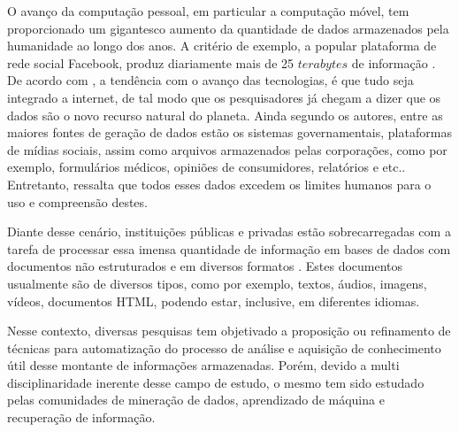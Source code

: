 
O avanço da computação pessoal, em particular a computação móvel, tem proporcionado um gigantesco
aumento da quantidade de dados armazenados pela humanidade ao longo dos anos. A critério de exemplo,
a popular plataforma de rede social Facebook\footnotemark, produz diariamente mais de 25 $terabytes$
de informação \cite{Havens2012}. De acordo com , a tendência com o avanço das
tecnologias, é que tudo seja integrado a internet, de tal modo que os pesquisadores já chegam a
dizer que os dados são o novo recurso natural do planeta. Ainda segundo os autores,
entre as maiores fontes de geração de dados estão os sistemas governamentais, plataformas de mídias
sociais, assim como arquivos armazenados pelas corporações, como por exemplo, formulários médicos,
opiniões de consumidores, relatórios e etc.. Entretanto,  ressalta que 
todos esses dados excedem os limites humanos para o uso e compreensão destes.

Diante desse cenário, instituições públicas e privadas estão sobrecarregadas com a tarefa de
processar essa imensa quantidade de informação em bases de dados com documentos não estruturados e
em diversos formatos \cite{Kobayashi2008}. Estes documentos usualmente são de diversos tipos,
como por exemplo, textos, áudios, imagens, vídeos, documentos HTML, podendo estar, inclusive, em diferentes idiomas. 

Nesse contexto, diversas pesquisas tem objetivado a proposição ou refinamento de técnicas para
automatização do processo de análise e aquisição de conhecimento útil desse montante de informações
armazenadas. Porém, devido a multi disciplinaridade inerente desse campo de estudo, o mesmo tem
sido estudado pelas comunidades de mineração de dados, aprendizado de máquina e recuperação de
informação.

